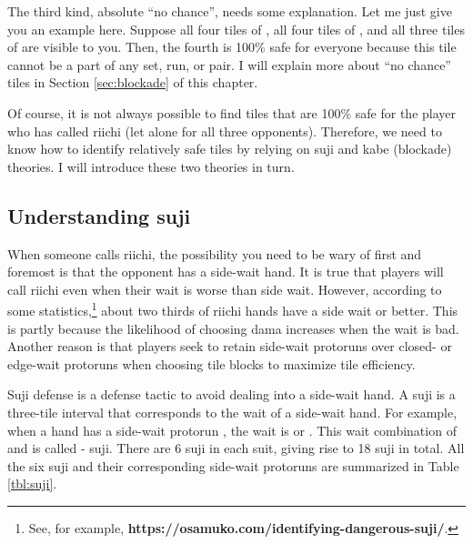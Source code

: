 \bigskip
The third kind, absolute ``no chance'', needs some explanation. Let me just give you an example here. Suppose all four tiles of {\LARGE {}}, all four tiles of {\LARGE {}}, and all three tiles of {\LARGE {}} are visible to you. Then, the fourth {\LARGE {}} is 100\% safe for everyone because this tile cannot be a part of any set, run, or pair. I will explain more about ``no chance'' tiles in Section \ref{sec:blockade} of this chapter.

\bigskip
Of course, it is not always possible to find tiles that are 100\% safe for the player who has called riichi (let alone for all three opponents). Therefore, we need to know how to identify relatively safe tiles by relying on {\jap suji} and {\jap kabe} (blockade) theories. I will introduce these two theories in turn.

\subsection{Understanding {\jap suji}}  \label{sec:suji}

When someone calls riichi, the possibility you need to be wary of first and foremost is that the opponent has a side-wait hand. 
It is true that players will call riichi even when their wait is worse than side wait. However, according to some statistics,\footnote{See, for example, \textbf{https://osamuko.com/identifying-dangerous-suji/}.} about two thirds of riichi hands have a side wait or better. This is partly because the likelihood of choosing {\jap dama} increases when the wait is bad. Another reason is that players seek to retain side-wait protoruns over closed- or edge-wait protoruns when choosing tile blocks to maximize tile efficiency.

\bigskip
{\jap Suji} defense is a defense tactic to avoid dealing into a side-wait hand. A {\jap suji} is a three-tile interval that corresponds to the wait of a side-wait hand. For example, when a hand has a side-wait protorun {\LARGE {}}, the wait is {\LARGE {}} or {\LARGE {}}. This wait combination of {\LARGE{}} and {\LARGE{}} is called {\LARGE{}-} {\jap suji}. There are 6 {\jap suji} in each suit, giving rise to 18 {\jap suji} in total. All the six {\jap suji} and their corresponding side-wait protoruns are summarized in Table \ref{tbl:suji}. 

